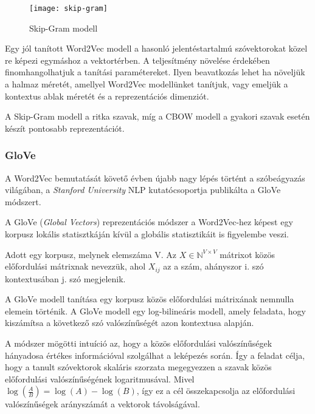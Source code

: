 \begin{figure}[H]
	\centering
	\texttt{[image: skip-gram]}
	\caption{Skip-Gram modell}
\end{figure}

Egy jól tanított Word2Vec modell a hasonló jelentéstartalmú szóvektorokat közel re képezi egymáshoz a vektortérben. 
A teljesítmény növelése érdekében finomhangolhatjuk a tanítási paramétereket. Ilyen beavatkozás lehet ha növeljük a halmaz méretét, amellyel Word2Vec modellünket tanítjuk, vagy emeljük a kontextus ablak méretét és a reprezentációs dimenziót.

\begin{note}
	A Skip-Gram modell a ritka szavak, míg a CBOW modell a gyakori szavak esetén készít pontosabb reprezentációt.
\end{note}


\subsubsection{GloVe}
A Word2Vec bemutatását követő évben újabb nagy lépés történt a szóbeágyazás világában, a \textit{Stanford University} NLP kutatócsoportja publikálta a GloVe módszert.

A GloVe (\textit{Global Vectors}) reprezentációs módszer a Word2Vec-hez képest egy korpusz lokális statisztkáján kívül a globális statisztikáit is figyelembe veszi. 

\begin{definition}
	Adott egy korpusz, melynek elemszáma V. Az $X \in \mathbb{N}^{V \times V}$ mátrixot közös előfordulási mátrixnak nevezzük, ahol $X_{ij}$ az a szám, ahányszor i. szó kontextusában j. szó megjelenik.  
\end{definition}

A GloVe modell tanítása egy korpusz közös előfordulási mátrixának nemnulla elemein történik. A GloVe modell egy log-bilineáris modell, amely feladata, hogy kiszámítsa a következő szó valószínűségét azon kontextusa alapján.

A módszer mögötti intuíció az, hogy a közös előfordulási valószínűségek hányadosa értékes információval szolgálhat a leképezés során. Így a feladat célja, hogy a tanult szóvektorok skaláris szorzata megegyezzen a szavak közös előfordulási valószínűségének logaritmusával. Mivel $\log \left( \frac{A}{B} \right) = \log \left( A \right) - \log \left( B \right)$, így ez a cél összekapcsolja az előfordulási valószínűségek arányszámát a vektorok távolságával.

